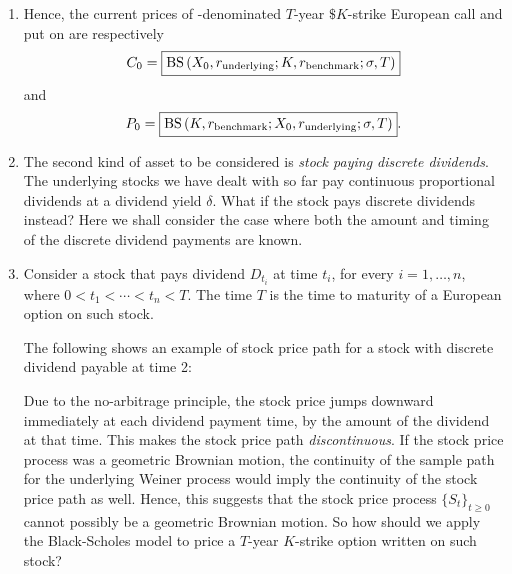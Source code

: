 \begin{enumerate}
\item Hence, the current prices of -denominated \(T\)-year
\(\$K\)-strike European call and put on  are respectively
\[
C_0=\boxed{\operatorname{BS}\qty(X_0,r_{\mathrm{underlying}};K,r_{\mathrm{benchmark}};\sigma,T)}
\]
and
\[
P_0=\boxed{\operatorname{BS}\qty(K,r_{\mathrm{benchmark}};X_0,r_{\mathrm{underlying}};\sigma,T)}.
\]
\item The second kind of asset to be considered is \emph{stock paying discrete
dividends}. The underlying stocks we have dealt with so far pay continuous
proportional dividends at a dividend yield \(\delta\). What if the stock pays
discrete dividends instead? Here we shall consider the case where both the
amount and timing of the discrete dividend payments are known.

\item Consider a stock that pays dividend \(D_{t_i}\) at time \(t_i\), for
every \(i=1,\dotsc,n\), where \(0<t_1<\dotsb<t_n<T\). The time \(T\) is the
time to maturity of a European option on such stock.

The following shows an example of stock price path for a stock with discrete
dividend payable at time 2:
\begin{center}
\end{center}
Due to the no-arbitrage principle, the stock price jumps downward immediately
at each dividend payment time, by the amount of the dividend at that time. This
makes the stock price path \emph{discontinuous}. If the stock price process was
a geometric Brownian motion, the continuity of the sample path for the
underlying Weiner process would imply the continuity of the stock price path as
well. Hence, this suggests that the stock price process \(\{S_t\}_{t\ge 0}\)
cannot possibly be a geometric Brownian motion. So how should we apply the
Black-Scholes model to price a \(T\)-year \(K\)-strike option written on such
stock?


\end{enumerate}
